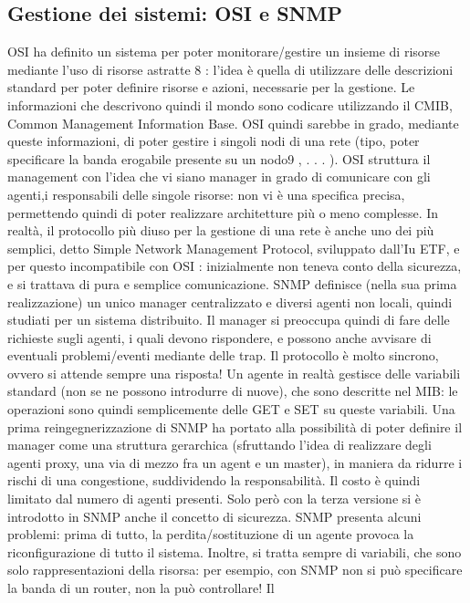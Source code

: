 \subsection{Gestione dei sistemi: OSI e SNMP}
OSI ha definito un sistema per poter monitorare/gestire un insieme di risorse
mediante l'uso di risorse astratte 8 : l'idea è quella di utilizzare delle descrizioni
standard per poter definire risorse e azioni, necessarie per la gestione. Le informazioni che descrivono quindi il mondo
sono codicare utilizzando il CMIB,
Common Management Information Base. OSI quindi sarebbe in grado, mediante queste informazioni, di poter gestire i
singoli nodi di una rete (tipo, poter
specificare la banda erogabile presente su un nodo9 , . . . ). OSI struttura il management con l'idea che vi siano
manager
in grado di comunicare con gli agenti,i
responsabili delle singole risorse: non vi è una specifica precisa, permettendo
quindi di poter realizzare architetture più o meno complesse.
In realtà, il protocollo più diuso per la gestione di una rete è anche uno
dei più semplici, detto Simple Network Management Protocol, sviluppato dall'Iu
ETF, e per questo incompatibile con OSI : inizialmente non teneva conto della
sicurezza, e si trattava di pura e semplice comunicazione.
SNMP definisce (nella sua prima realizzazione) un unico manager centralizzato e diversi agenti non locali, quindi
studiati
per un sistema distribuito. Il
manager si preoccupa quindi di fare delle richieste sugli agenti, i quali devono
rispondere, e possono anche avvisare di eventuali problemi/eventi mediante delle
trap. Il protocollo è molto sincrono, ovvero si attende sempre una risposta!
Un agente in realtà gestisce delle variabili standard (non se ne possono
introdurre di nuove), che sono descritte nel MIB: le operazioni sono quindi
semplicemente delle GET e SET su queste variabili.
Una prima reingegnerizzazione di SNMP ha portato alla possibilità di poter
definire il manager come una struttura gerarchica (sfruttando l'idea di realizzare
degli agenti proxy, una via di mezzo fra un agent e un master), in maniera da
ridurre i rischi di una congestione, suddividendo la responsabilità. Il costo è
quindi limitato dal numero di agenti presenti. Solo però con la terza versione si
è introdotto in SNMP anche il concetto di sicurezza.
SNMP presenta alcuni problemi: prima di tutto, la perdita/sostituzione di
un agente provoca la riconfigurazione di tutto il sistema. Inoltre, si tratta sempre di variabili, che sono solo
rappresentazioni della risorsa: per esempio, con
SNMP non si può specificare la banda di un router, non la può controllare! Il
